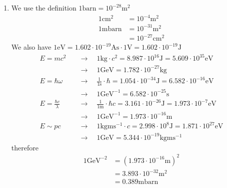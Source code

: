 \documentclass[10pt,a4paper]{book}
\theoremstyle{definition}
\begin{document}
\begin{enumerate}
\item We use the definition $1\text{barn}=10^{-28}\text{m}^2$
\begin{align}
    1\text{cm}^2  &= 10^{-4}\text{m}^2\\
    1\text{mbarn} &= 10^{-31}\text{m}^2\\
                  &= 10^{-27}\text{cm}^2
\end{align}
We also have $1\text{eV} =1.602\cdot10^{-19}\text{As}\cdot1\text{V}=1.602\cdot10^{-19}\text{J}$
\begin{align}
    E=mc^2\quad
    &\rightarrow\quad 1\text{kg}\cdot c^2 = 8.987\cdot10^{16}\text{J}=5.609\cdot10^{35}\text{eV}\\
    &\rightarrow\quad 1\text{GeV} = 1.782\cdot10^{-27}\text{kg}\\
    E=\hbar\omega\quad
    &\rightarrow\quad \frac{1}{1\text{s}}\cdot \hbar = 1.054\cdot10^{-34}\text{J}=6.582\cdot10^{-16}\text{eV}\\
    &\rightarrow\quad 1\text{GeV}^{-1} = 6.582\cdot10^{-25}\text{s}\\
    E= \frac{\hbar c}{\lambda}\quad
    &\rightarrow\quad \frac{1}{1\text{m}}\cdot \hbar c = 3.161\cdot10^{-26}\text{J}=1.973\cdot10^{-7}\text{eV}\\
    &\rightarrow\quad 1\text{GeV}^{-1} = 1.973\cdot10^{-16}\text{m}\\
    E\sim pc\quad
    &\rightarrow\quad 1\text{kg}\text{m}\text{s}^{-1}\cdot c= 2.998\cdot10^{8}\text{J}=1.871\cdot10^{27}\text{eV}\\
    &\rightarrow\quad 1\text{GeV} = 5.344\cdot10^{-19}\text{kg}\text{m}\text{s}^{-1}
\end{align}
therefore
\begin{align}
    1\text{GeV}^{-2} &= (1.973\cdot10^{-16}\text{m})^2\\
    &=3.893\cdot10^{-32}\text{m}^2\\
    &=0.389\text{mbarn}
\end{align}
\end{enumerate}
\end{document}
